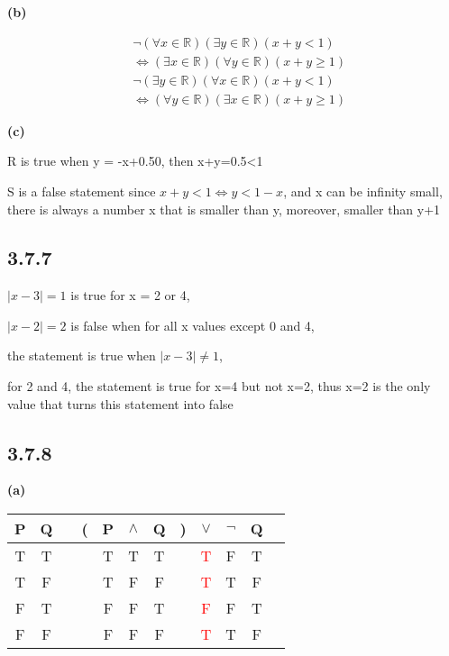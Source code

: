 \documentclass{article}
\begin{document}
\textbf{(b)}

\begin{align*}
    &\neg (\forall x \in \mathbb{R})(\exists y \in \mathbb{R})(x+y < 1) \\
    &\iff (\exists x \in \mathbb{R})(\forall y \in \mathbb{R})(x+y \geq 1) \\
    &\neg (\exists y \in \mathbb{R})(\forall x \in \mathbb{R})(x+y<1)\\
    &\iff (\forall y \in \mathbb{R})(\exists x \in \mathbb{R})(x+y\geq 1)
\end{align*}

\textbf{(c)}

R is true when y = -x+0.50, then x+y=0.5<1

S is a false statement since $x+y<1 \iff y<1-x$, and x can be infinity small, there is always a number x that is smaller than y, moreover, smaller than y+1 

\subsection*{3.7.7}

$|x-3|=1$ is true for x = 2 or 4,

$|x-2|=2$ is false when for all x values except 0 and 4,

the statement is true when $|x-3|\neq 1$,

for 2 and 4, the statement is true for x=4 but not x=2, thus x=2 is the only value that turns this statement into false

\subsection*{3.7.8}

\textbf{(a)}

\begin{tabular}{@{ }c@{ }@{ }c | c@{ }@{}c@{}@{ }c@{ }@{ }c@{ }@{ }c@{ }@{}c@{}@{ }c@{ }@{ }c@{ }@{ }c@{ }@{ }c}
P & Q &  & ( & P & $\land$ & Q & ) & $\lor$ & $\lnot$ & Q & \\
\hline 
T & T &  &  & T & T & T &  & \textcolor{red}{T} & F & T & \\
T & F &  &  & T & F & F &  & \textcolor{red}{T} & T & F & \\
F & T &  &  & F & F & T &  & \textcolor{red}{F} & F & T & \\
F & F &  &  & F & F & F &  & \textcolor{red}{T} & T & F & \\
\end{tabular}
\end{document}
